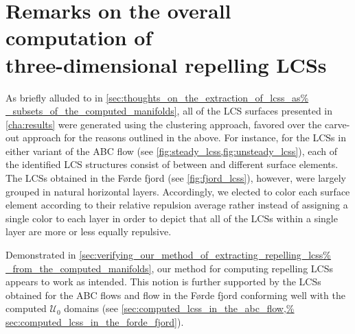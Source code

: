\section[Remarks on the overall computation of three-dimensional repelling
LCSs]{Remarks on the overall computation of \\\phantom{5.5} three-dimensional
repelling LCSs}
\label{sec:remarks_on_the_overall_computation_of_three_dimensional_repelling_lcss}

As briefly alluded to in \cref{sec:thoughts_on_the_extraction_of_lcss_as%
_subsets_of_the_computed_manifolds}, all of the LCS surfaces presented in
\cref{cha:results} were generated using the clustering approach, favored over
the carve-out approach for the reasons outlined in the above. For instance, for
the LCSs in either variant of the ABC flow (see
\cref{fig:steady_lcss,fig:unsteady_lcss}), each of the identified LCS
structures consist of between  and  different surface
elements. The LCSs obtained in the Førde fjord (see \ref{fig:fjord_lcss}),
however, were largely grouped in natural horizontal layers. Accordingly, we
elected to color each surface element according to their relative repulsion
average rather instead of assigning a single color to each layer in order to
depict that all of the LCSs within a single layer are more or less equally
repulsive.

Demonstrated in \cref{sec:verifying_our_method_of_extracting_repelling_lcss%
_from_the_computed_manifolds}, our method for computing repelling LCSs appears
to work as intended. This notion is further supported by the LCSs obtained for
the ABC flows and flow in the Førde fjord conforming well with the computed
$\mathcal{U}_{0}$ domains (see \cref{sec:computed_lcss_in_the_abc_flow,%
sec:computed_lcss_in_the_forde_fjord}).




